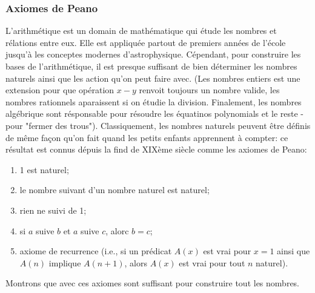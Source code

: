 \documentclass[12pt, a4paper]{article}
\begin{document}
\subsubsection*{Axiomes de Peano}
L'arithmétique est un domain de mathématique qui étude les nombres et rélations entre eux.
Elle est appliquée partout de premiers années de l'école jusqu'à les conceptes modernes d'astrophysique.
Cépendant, pour construire les bases de l'arithmétique, il est presque suffisant de bien déterminer les nombres naturels ainsi que les action qu'on peut faire avec.
(Les nombres entiers est une extension pour que opération $x - y$ renvoit toujours un nombre valide, les nombres rationnels aparaissent si on étudie la division. Finalement, les nombres algébrique sont résponsable pour résoudre les équatinos polynomials et le reste - pour "fermer des trous").
Classiquement, les nombres naturels peuvent être définis de même façon qu'on fait quand les petits enfants apprennent à compter: ce résultat est connus dépuis la find de XIXème siècle comme les axiomes de Peano:
\begin{enumerate}
	\item 1 est naturel;
	\item le nombre suivant d'un nombre naturel est naturel;
	\item rien ne suivi de 1;
	\item si $a$ suive $b$ et $a$ suive $c$, alorc $b=c$;
	\item axiome de recurrence (i.e., si un prédicat $A(x)$ est vrai pour $x=1$ ainsi que $A(n)$ implique $A(n+1)$, alors $A(x)$ est vrai pour tout $n$ naturel).
\end{enumerate}
Montrons que avec ces axiomes sont suffisant pour construire tout les nombres.
\end{document}
